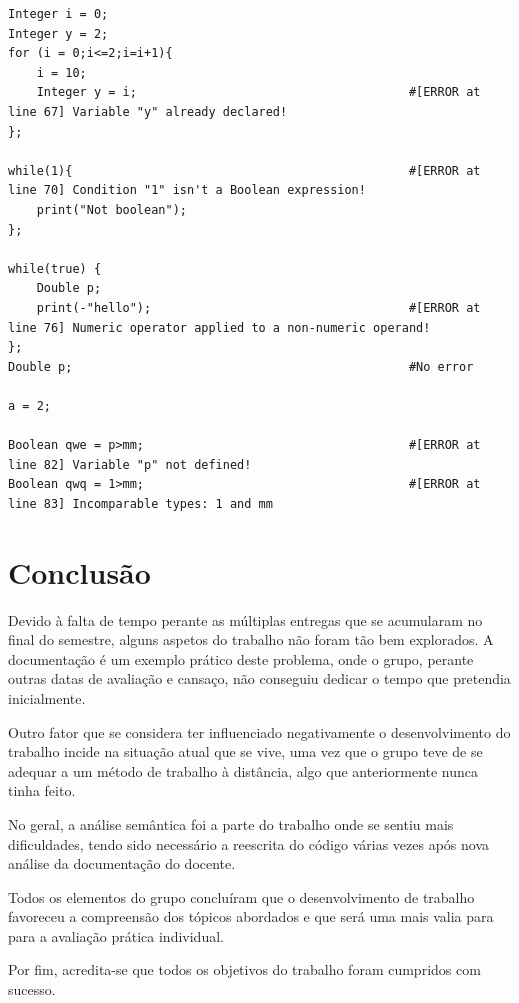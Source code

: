 \documentclass[10pt,portuguese]{article}
\begin{document}
\begin{lstlisting}
Integer i = 0;
Integer y = 2;
for (i = 0;i<=2;i=i+1){
    i = 10;
    Integer y = i;                                      #[ERROR at line 67] Variable "y" already declared!    
};

while(1){                                               #[ERROR at line 70] Condition "1" isn't a Boolean expression!
    print("Not boolean");
};

while(true) {
    Double p;
    print(-"hello");                                    #[ERROR at line 76] Numeric operator applied to a non-numeric operand!
};
Double p;                                               #No error

a = 2;

Boolean qwe = p>mm;                                     #[ERROR at line 82] Variable "p" not defined!
Boolean qwq = 1>mm;                                     #[ERROR at line 83] Incomparable types: 1 and mm
\end{lstlisting}

\section{Conclusão}

\par Devido à falta de tempo perante as múltiplas entregas que se acumularam no final do semestre, alguns aspetos do trabalho não foram tão bem explorados. A documentação é um exemplo prático deste problema, onde o grupo, perante outras datas de avaliação e cansaço, não conseguiu dedicar o tempo que pretendia inicialmente.

\par Outro fator que se considera ter influenciado negativamente o desenvolvimento do trabalho incide na situação atual que se vive, uma vez que o grupo teve de se adequar a um método de trabalho à distância, algo que anteriormente nunca tinha feito.

\par No geral, a análise semântica foi a parte do trabalho onde se sentiu mais dificuldades, tendo sido necessário a reescrita do código várias vezes após nova análise da documentação do docente.

\par Todos os elementos do grupo concluíram que o desenvolvimento de trabalho favoreceu a compreensão dos tópicos abordados e que será uma mais valia para para a avaliação prática individual.

\par Por fim, acredita-se que todos os objetivos do trabalho foram cumpridos com sucesso.
\end{document}
